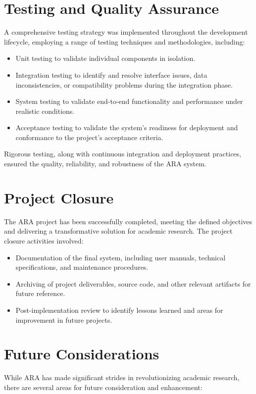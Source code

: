 \documentclass[a4paper]{article}
\begin{document}
\section{Testing and Quality Assurance}
A comprehensive testing strategy was implemented throughout the development lifecycle, employing a range of testing techniques and methodologies, including:

\begin{itemize}
   \item Unit testing to validate individual components in isolation.
   \item Integration testing to identify and resolve interface issues, data inconsistencies, or compatibility problems during the integration phase.
   \item System testing to validate end-to-end functionality and performance under realistic conditions.
   \item Acceptance testing to validate the system's readiness for deployment and conformance to the project's acceptance criteria.
\end{itemize}

Rigorous testing, along with continuous integration and deployment practices, ensured the quality, reliability, and robustness of the ARA system.

\section{Project Closure}
The ARA project has been successfully completed, meeting the defined objectives and delivering a transformative solution for academic research. The project closure activities involved:

\begin{itemize}
   \item Documentation of the final system, including user manuals, technical specifications, and maintenance procedures.
   \item Archiving of project deliverables, source code, and other relevant artifacts for future reference.
   \item Post-implementation review to identify lessons learned and areas for improvement in future projects.
\end{itemize}

\section{Future Considerations}
While ARA has made significant strides in revolutionizing academic research, there are several areas for future consideration and enhancement:
\end{document}
